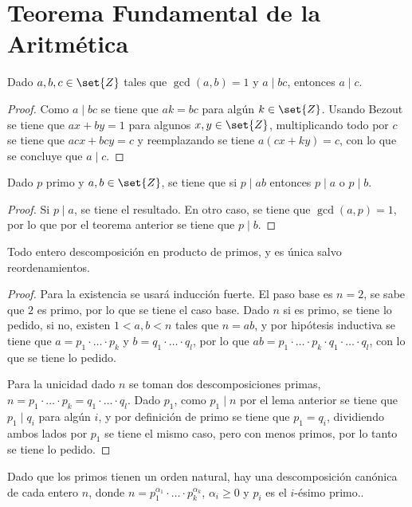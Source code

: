\documentclass{ayudantia}
\begin{document}
\section{Teorema Fundamental de la Aritmética}
\begin{thm}
    Dado \(a,b,c\in\set{Z}\) tales que \(\gcd(a,b)=1\) y \(a\mid bc\), entonces \(a\mid c\).
\end{thm}
\begin{proof}
    Como \(a\mid bc\) se tiene que \(ak=bc\) para algún \(k\in\set{Z}\). Usando Bezout se tiene que \(ax+by=1\) para algunos \(x,y\in\set{Z}\), multiplicando todo por \(c\) se tiene que \(acx+bcy=c\) y reemplazando se tiene \(a(cx+ky)=c\), con lo que se concluye que \(a\mid c\).
\end{proof}
\begin{lem}
    Dado \(p\) primo y \(a,b\in\set{Z}\), se tiene que si \(p\mid ab\) entonces \(p\mid a\) o \(p\mid b\).
\end{lem}
\begin{proof}
    Si \(p\mid a\), se tiene el resultado. En otro caso, se tiene que \(\gcd(a,p)=1\), por lo que por el teorema anterior se tiene que \(p\mid b\).
\end{proof}
\begin{thm}
    Todo entero descomposición en producto de primos, y es única salvo reordenamientos. 
\end{thm}
\begin{proof}
    Para la existencia se usará inducción fuerte. El paso base es \(n=2\), se sabe que \(2\) es primo, por lo que se tiene el caso base. Dado \(n\) si es primo, se tiene lo pedido, si no, existen \(1<a,b<n\) tales que \(n=ab\), y por hipótesis inductiva se tiene que \(a=p_1\cdot\ldots\cdot p_k\) y \(b=q_1\cdot\ldots\cdot q_l\), por lo que \(ab=p_1\cdot\ldots\cdot p_k\cdot q_1\cdot\ldots\cdot q_l\), con lo que se tiene lo pedido.

    Para la unicidad dado \(n\) se toman dos descomposiciones primas, \(n=p_1\cdot\ldots\cdot p_k=q_1\cdot\ldots\cdot q_l\). Dado \(p_1\), como \(p_1\mid n\) por el lema anterior se tiene que \(p_1\mid q_i\) para algún \(i\), y por definición de primo se tiene que \(p_1=q_i\), dividiendo ambos lados por \(p_1\) se tiene el mismo caso, pero con menos primos, por lo tanto se tiene lo pedido.
\end{proof}
\begin{remark}
    Dado que los primos tienen un orden natural, hay una descomposición canónica de cada entero \(n\), donde \(n=p_1^{\alpha_1}\cdot\ldots\cdot p_k^{\alpha_k}\), \(\alpha_i\geq 0\) y \(p_i\) es el \(i\)-ésimo primo..
\end{remark}
\end{document}
